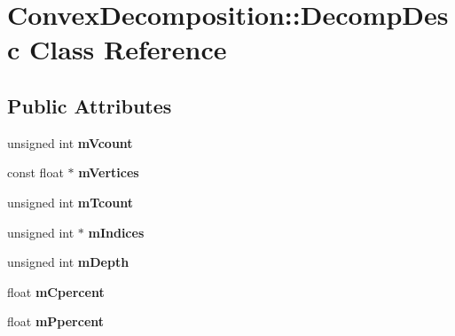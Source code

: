\hypertarget{class_convex_decomposition_1_1_decomp_desc}{\section{Convex\-Decomposition\-:\-:Decomp\-Desc Class Reference}
\label{class_convex_decomposition_1_1_decomp_desc}
}
\subsection*{Public Attributes}
\begin{DoxyCompactItemize}
\item 
\hypertarget{class_convex_decomposition_1_1_decomp_desc_ad29b91a963df41cefa7235201323f3b4}{unsigned int {\bfseries m\-Vcount}}\label{class_convex_decomposition_1_1_decomp_desc_ad29b91a963df41cefa7235201323f3b4}

\item 
\hypertarget{class_convex_decomposition_1_1_decomp_desc_a0f8347667402ee1c78be17a8e7e73e2b}{const float $\ast$ {\bfseries m\-Vertices}}\label{class_convex_decomposition_1_1_decomp_desc_a0f8347667402ee1c78be17a8e7e73e2b}

\item 
\hypertarget{class_convex_decomposition_1_1_decomp_desc_a96c4557cd6f3c0868cf231f152ed1fb4}{unsigned int {\bfseries m\-Tcount}}\label{class_convex_decomposition_1_1_decomp_desc_a96c4557cd6f3c0868cf231f152ed1fb4}

\item 
\hypertarget{class_convex_decomposition_1_1_decomp_desc_a030c95c09800d3cdcd03c7180450f4a4}{unsigned int $\ast$ {\bfseries m\-Indices}}\label{class_convex_decomposition_1_1_decomp_desc_a030c95c09800d3cdcd03c7180450f4a4}

\item 
\hypertarget{class_convex_decomposition_1_1_decomp_desc_ad4eddfbbbb168d591d351935dc56b3e4}{unsigned int {\bfseries m\-Depth}}\label{class_convex_decomposition_1_1_decomp_desc_ad4eddfbbbb168d591d351935dc56b3e4}

\item 
\hypertarget{class_convex_decomposition_1_1_decomp_desc_aeaeb0530e55390a315656ea93979be5b}{float {\bfseries m\-Cpercent}}\label{class_convex_decomposition_1_1_decomp_desc_aeaeb0530e55390a315656ea93979be5b}

\item 
\hypertarget{class_convex_decomposition_1_1_decomp_desc_a8a43f17357737275d5a002c494c8d36f}{float {\bfseries m\-Ppercent}}\label{class_convex_decomposition_1_1_decomp_desc_a8a43f17357737275d5a002c494c8d36f}


\end{DoxyCompactItemize}

